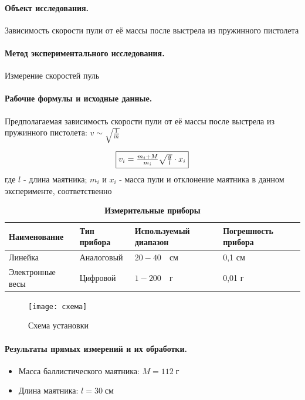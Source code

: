 \documentclass{article}
\begin{document}
\paragraph{Объект исследования.}
Зависимость скорости пули от её массы после выстрела из пружинного пистолета

\paragraph{Метод экспериментального исследования.}
Измерение скоростей пуль

 \paragraph{Рабочие формулы и исходные данные.}\hypertarget{formuls}{}
 \begin{flushleft}
 	Предполагаемая зависимость скорости пули от её массы после выстрела из пружинного пистолета: $ v\sim\sqrt{\frac{1}{m}}$
 \end{flushleft}

\begin{equation}
	\fbox{$v_i=\frac{m_i+M}{m_i}\sqrt{\frac{g}{l}}\cdot x_i$}
\end{equation}
 	где $l$ - длина маятника; $m_i$ и $x_i$ - масса пули и отклонение маятника в данном эксперименте, соответственно

\begin{table}[h]
	\caption{\bf Измерительные приборы}
	\begin{tabular}[c]{|p{7.5em}|p{7.5em}|p{7.5em}| p{7.5em}|}
		\hline
		Наименование & Тип прибора & Используемый диапазон & Погрешность прибора\\\hline
		Линейка & Аналоговый & $20 - 40\quad\mbox{см}$ & 0,1 см\\
		\hline
		Электронные весы& Цифровой & $1 - 200\quad\mbox{г}$ & 0,01 г \\
		\hline
	\end{tabular}
\end{table}

 \begin{figure}[htb]
 	\caption{Схема установки}
\centering \texttt{[image: схема]}
 \end{figure}

\paragraph{Результаты прямых измерений и их обработки.}
\begin{itemize}
	\item Масса баллистического маятника: $ M=112\;\mbox{г} $ 
	\item Длина маятника: $ l=30\;\mbox{см}$
\end{itemize}
		
\end{document}
